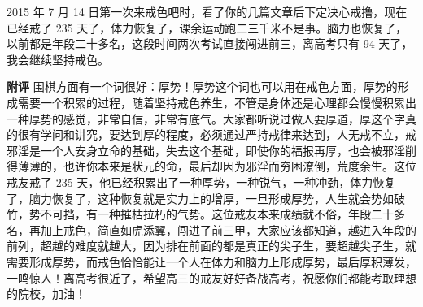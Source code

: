 \begin{case}
    2015 年 7 月 14 日第一次来戒色吧时，看了你的几篇文章后下定决心戒撸，现在已经戒了 235 天了，体力恢复了，课余运动跑二三千米不是事。脑力也恢复了，以前都是年段二十多名，这段时间两次考试直接闯进前三，离高考只有 94 天了，我会继续坚持戒色。

    \textbf{附评} 围棋方面有一个词很好：厚势！厚势这个词也可以用在戒色方面，厚势的形成需要一个积累的过程，随着坚持戒色养生，不管是身体还是心理都会慢慢积累出一种厚势的感觉，非常自信，非常有底气。大家都听说过做人要厚道，厚这个字真的很有学问和讲究，要达到厚的程度，必须通过严持戒律来达到，人无戒不立，戒邪淫是一个人安身立命的基础，失去这个基础，即使你的福报再厚，也会被邪淫削得薄薄的，也许你本来是状元的命，最后却因为邪淫而穷困潦倒，荒度余生。这位戒友戒了 235 天，他已经积累出了一种厚势，一种锐气，一种冲劲，体力恢复了，脑力恢复了，这种恢复就是实力上的增厚，一旦形成厚势，人生就会势如破竹，势不可挡，有一种摧枯拉朽的气势。这位戒友本来成绩就不俗，年段二十多名，再加上戒色，简直如虎添翼，闯进了前三甲，大家应该都知道，越进入年段的前列，超越的难度就越大，因为排在前面的都是真正的尖子生，要超越尖子生，就需要形成厚势，而戒色恰恰能让一个人在体力和脑力上形成厚势，最后厚积薄发，一鸣惊人！离高考很近了，希望高三的戒友好好备战高考，祝愿你们都能考取理想的院校，加油！
\end{case}

